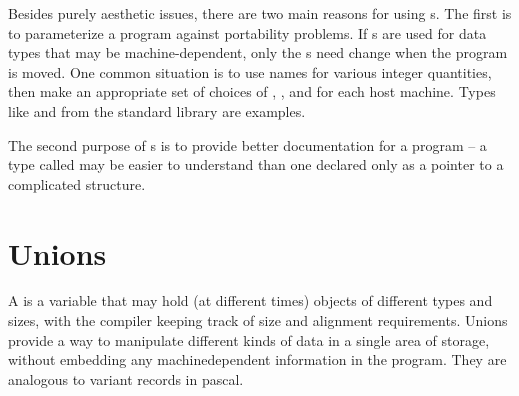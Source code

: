 Besides purely aesthetic issues, there are two main reasons for using s.
The first is to parameterize a program against portability problems.
If s are used for data types that may be machine-dependent, only the s need change when the program is moved.
One common situation is to use  names for various integer quantities, then make an appropriate set of choices of , , and  for each host machine.
Types like  and  from the standard library are examples.

The second purpose of s is to provide better documentation for a program -- a type called  may be easier to understand than one declared only as a pointer to a complicated structure.



\section{Unions}


A  is a variable that may hold (at different times) objects of different types and sizes, with the compiler keeping track of size and alignment requirements.
Unions provide a way to manipulate different kinds of data in a single area of storage, without embedding any machinedependent information in the program.
They are analogous to variant records in pascal.

